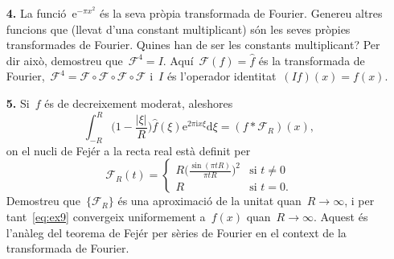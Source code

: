 \documentclass[a4paper]{article}
\theoremstyle{definition}
\newcommand{\iu}{\mathrm{i}}
\newcommand{\e}{\mathrm{e}}
\newcommand{\uppi}{\pi}
\newcommand{\diff}{\mathrm{d}}
\newcommand{\abs}[1]{\lvert{#1}\rvert}
\newcommand{\F}{\mathcal{F}}
\newcommand{\conv}{\mathop{\ast}}
\begin{document}
\begin{enumerate}
    \item[\textbf{4.}] La funció~\(\e^{-\uppi x^{2}}\) és la seva pròpia
        transformada de Fourier.
        Genereu altres funcions que (llevat d'una constant multiplicant) són les
        seves pròpies transformades de Fourier.
        Quines han de ser les constants multiplicant?
        Per dir això, demostreu que~\(\F^{4} = I\).
        Aquí~\(\F(f) = \widehat{f}\) és la transformada de Fourier,~\(\F^{4} =
        \F\circ\F\circ\F\circ\F\) i~\(I\) és l'operador identitat~\((If)(x) =
        f(x)\).
\end{enumerate}

\begin{enumerate}
    \item[\textbf{5.}] Si~\(f\) és de decreixement moderat, aleshores
        \begin{equation}
            \label{eq:ex9}
            \int_{-R}^{R}\biggl(1 - \frac{\abs{\xi}}{R}\biggr)
            \widehat{f}(\xi)\e^{2\uppi\iu x\xi}\diff\xi
            = (f\conv\F_{R})(x),
        \end{equation}
        on el nucli de Fejér a la recta real està definit per
        \[
            \F_{R}(t) = \begin{cases}\displaystyle
                R\biggl(\frac{\sin(\uppi tR)}{\uppi tR}\biggr)^{2}
                & \text{si } t \neq 0 \\
                R & \text{si } t = 0.
            \end{cases}
        \]
        Demostreu que~\(\{\F_{R}\}\) és una aproximació de la unitat
        quan~\(R\to\infty\), i per tant~\ref{eq:ex9} convergeix uniformement
        a~\(f(x)\) quan~\(R\to\infty\).
        Aquest és l'anàleg del teorema de Fejér per sèries de Fourier en el
        context de la transformada de Fourier.
\end{enumerate}
\end{document}
